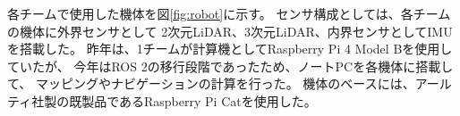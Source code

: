 \documentclass[twocolumn,9pt]{jsproceedings}
\begin{document}
各チームで使用した機体を図\ref{fig:robot}に示す。
センサ構成としては、各チームの機体に外界センサとして
2次元LiDAR、3次元LiDAR、内界センサとしてIMUを搭載した。
昨年は、1チームが計算機としてRaspberry Pi 4 Model Bを使用していたが\cite{池邉2022}、
今年はROS 2の移行段階であったため、ノートPCを各機体に搭載して、
マッピングやナビゲーションの計算を行った。
機体のベースには、アールティ社製の既製品であるRaspberry Pi Cat\cite{RTshop}を使用した。

\end{document}
